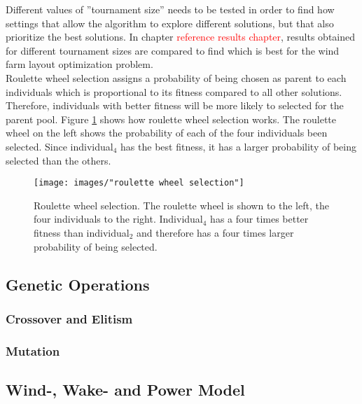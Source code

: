 \documentclass{article}
\begin{document}
\noindent Different values of ''tournament size'' needs to be tested in order to find how settings that allow the algorithm to explore different solutions, but that also prioritize the best solutions. In chapter \textcolor{red}{reference results chapter}, results obtained for different tournament sizes are compared to find which is best for the wind farm layout optimization problem. \\


\noindent Roulette wheel selection assigns a probability of being chosen as parent to each individuals which is proportional to its fitness compared to all other solutions. Therefore, individuals with better fitness will be more likely to selected for the parent pool. Figure \ref{figure:roulette wheel selection} shows how roulette wheel selection works. The roulette wheel on the left shows the probability of each of the four individuals been selected. Since individual$_4$ has the best fitness, it has a larger probability of being selected than the others. \\


\begin{figure}[h!]
\begin{center}
\texttt{[image: images/"roulette wheel selection"]}
\caption{Roulette wheel selection. The roulette wheel is shown to the left, the four individuals to the right. Individual$_4$ has a four times better fitness than individual$_2$ and therefore has a four times larger probability of being selected.}
\label{figure:roulette wheel selection}
\end{center}
\end{figure}


\subsection{Genetic Operations}\label{subsection:genetic operations}


\subsubsection{Crossover and Elitism}


\subsubsection{Mutation}


\subsection{Wind-, Wake- and Power Model}\label{subsection:wind-, wake- and power model}
\end{document}

